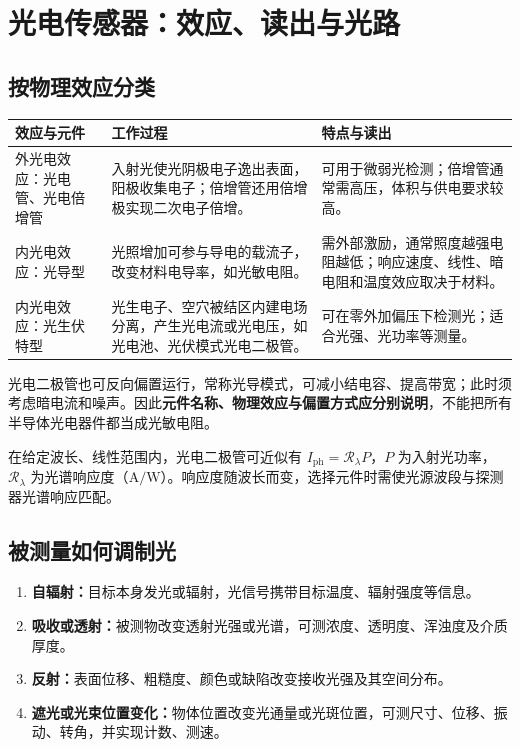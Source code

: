 \Needspace{5cm}
\section{光电传感器：效应、读出与光路}
\label{sec:ch4-photoelectric}
\noindent{}

\subsection{按物理效应分类}
\begin{table}[H]
\centering\small
\begin{tabularx}{\linewidth}{@{}p{2.2cm} X X@{}}
\toprule
效应与元件 & 工作过程 & 特点与读出 \\
\midrule
外光电效应：光电管、光电倍增管 & 入射光使光阴极电子逸出表面，阳极收集电子；倍增管还用倍增极实现二次电子倍增。 & 可用于微弱光检测；倍增管通常需高压，体积与供电要求较高。 \\
内光电效应：光导型 & 光照增加可参与导电的载流子，改变材料电导率，如光敏电阻。 & 需外部激励，通常照度越强电阻越低；响应速度、线性、暗电阻和温度效应取决于材料。 \\
内光电效应：光生伏特型 & 光生电子、空穴被结区内建电场分离，产生光电流或光电压，如光电池、光伏模式光电二极管。 & 可在零外加偏压下检测光；适合光强、光功率等测量。 \\
\bottomrule
\end{tabularx}
\end{table}

光电二极管也可反向偏置运行，常称光导模式，可减小结电容、提高带宽；此时须考虑暗电流和噪声。因此\textbf{元件名称、物理效应与偏置方式应分别说明}，不能把所有半导体光电器件都当成光敏电阻。

在给定波长、线性范围内，光电二极管可近似有 $I_{\mathrm{ph}}=\mathcal R_\lambda P$，$P$ 为入射光功率，$\mathcal R_\lambda$ 为光谱响应度（$\mathrm{A/W}$）。响应度随波长而变，选择元件时需使光源波段与探测器光谱响应匹配。

\subsection{被测量如何调制光}
\begin{enumerate}
\item \textbf{自辐射：}目标本身发光或辐射，光信号携带目标温度、辐射强度等信息。
\item \textbf{吸收或透射：}被测物改变透射光强或光谱，可测浓度、透明度、浑浊度及介质厚度。
\item \textbf{反射：}表面位移、粗糙度、颜色或缺陷改变接收光强及其空间分布。
\item \textbf{遮光或光束位置变化：}物体位置改变光通量或光斑位置，可测尺寸、位移、振动、转角，并实现计数、测速。
\end{enumerate}


